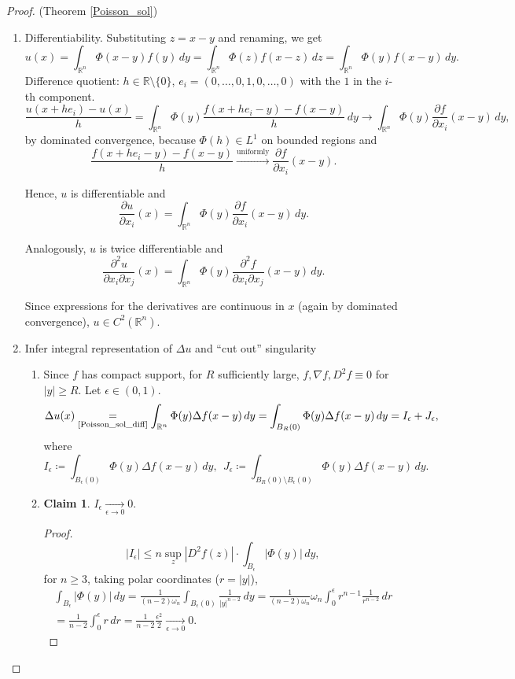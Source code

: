 \documentclass[12pt]{article}
\theoremstyle{definition}
\newtheorem*{claim*}{Claim}
\begin{document}
\begin{proof}
(Theorem \ref{Poisson_sol})

\begin{enumerate}[label=\arabic*.]
\item\label{Poisson_sol_diff} Differentiability. Substituting $z=x-y$ and renaming, we get
\[u(x)=\int_{\mathbb R^n}\Phi(x-y)f(y)\,dy=\int_{\mathbb R^n}\Phi(z)f(x-z)\,dz=\int_{\mathbb R^n}\Phi(y)f(x-y)\,dy.\]
Difference quotient: $h\in\mathbb R\setminus\{0\}$, $e_i=(0,\ldots,0,1,0,\ldots,0)$ with the $1$ in the $i$-th component.
\[\frac{u(x+he_i)-u(x)}h=\int_{\mathbb R^n}\Phi(y)\frac{f(x+he_i-y)-f(x-y)}h\,dy\longrightarrow\int_{\mathbb R^n}\Phi(y)\frac{\partial f}{\partial x_i}(x-y)\,dy,\]
by dominated convergence, because $\Phi(h)\in L^1$ on bounded regions and
\[\frac{f(x+he_i-y)-f(x-y)}h\xrightarrow{\text{uniformly}}\frac{\partial f}{\partial x_i}(x-y).\]

Hence, $u$ is differentiable and
\[\frac{\partial u}{\partial x_i}(x)=\int_{\mathbb R^n}\Phi(y)\frac{\partial f}{\partial x_i}(x-y)\,dy.\]

Analogously, $u$ is twice differentiable and
\[\frac{\partial^2u}{\partial x_i\partial x_j}(x)=\int_{\mathbb R^n}\Phi(y)\frac{\partial^2f}{\partial x_i\partial x_j}(x-y)\,dy.\]

Since expressions for the derivatives are continuous in $x$ (again by dominated convergence), $u\in C^2(\mathbb R^n)$.

\item Infer integral representation of $\Delta u$ and ``cut out'' singularity
\begin{enumerate}[label=(\arabic*)]
\item\label{compact_supp} Since $f$ has compact support, for $R$ sufficiently large, $f,\nabla f,D^2f\equiv0$ for $|y|\geq R$. Let $\epsilon\in(0,1)$.
\[\Delta u(x)\underset{\text{\ref{Poisson_sol_diff}}}=\int_{\mathbb R^n}\Phi(y)\Delta f(x-y)\,dy=\int_{B_R(0)}\Phi(y)\Delta f(x-y)\,dy=I_\epsilon+J_\epsilon,\]
where
\[I_\epsilon\coloneqq\int_{B_\epsilon(0)}\Phi(y)\Delta f(x-y)\,dy,\ \ J_\epsilon\coloneqq\int_{B_R(0)\setminus B_\epsilon(0)}\Phi(y)\Delta f(x-y)\,dy.\]

\item\label{Iepsto0}
\begin{claim*}
$I_\epsilon\xrightarrow[\epsilon\to0]{}0$.
\end{claim*}

\begin{proof}
\[|I_\epsilon|\leq n\sup_z|D^2f(z)|\cdot\int_{B_\epsilon}|\Phi(y)|\,dy,\]
for $n\geq3$, taking polar coordinates ($r=|y|$),
\begin{multline*}
\int_{B_\epsilon}|\Phi(y)|\,dy=\frac1{(n-2)\omega_n}\int_{B_\epsilon(0)}\frac1{|y|^{n-2}}\,dy=\frac1{(n-2)\omega_n}\omega_n\int_0^\epsilon r^{n-1}\frac1{r^{n-2}}\,dr\\
=\frac1{n-2}\int_0^\epsilon r\,dr=\frac1{n-2}\frac{\epsilon^2}2\xrightarrow[\epsilon\to0]{}0.
\end{multline*}
\end{proof}
\end{enumerate}


\end{enumerate}
\end{proof}
\end{document}
